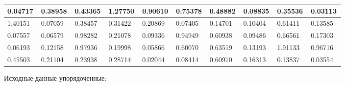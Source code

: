 \begin{changemargin}{-4cm}{0cm}
{\begin{tabular}{|p{0.08\linewidth}|p{0.08\linewidth}|p{0.08\linewidth}|p{0.08\linewidth}|p{0.08\linewidth}|p{0.08\linewidth}|p{0.08\linewidth}|p{0.08\linewidth}|p{0.08\linewidth}|p{0.08\linewidth}|}
\hline%
0.04717&0.38958&0.43365&1.27750&0.90610&0.75378&0.48882&0.08835&0.35536&0.03113\\%
\hline%
1.40151&0.07059&0.38457&0.31422&0.20869&0.07405&0.14701&0.10404&0.61411&0.13585\\%
\hline%
0.07557&0.06579&0.98282&0.21078&0.09336&0.94949&0.60938&0.09486&0.66561&0.17303\\%
\hline%
0.06193&0.12158&0.97936&0.19998&0.05866&0.60070&0.63519&0.13193&1.91133&0.96716\\%
\hline%
0.45503&0.21104&0.23938&0.28714&0.02044&0.08414&0.60970&0.16313&0.13837&0.03554\\%
\hline%
\end{tabular}%
\newline%
\newline%
%
}\end{changemargin}%
\newpage%
Исходные данные упорядоченные:\newline%
\newline%
%
